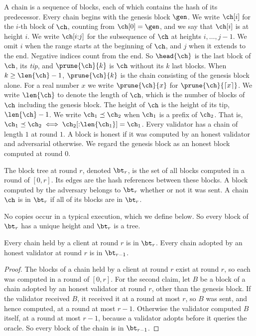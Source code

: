 A chain is a sequence of blocks, each of which contains the hash of its
predecessor. Every chain begins with the genesis block $\gen$. We write $\ch[i]$
for the $i$-th block of $\ch$, counting from $\ch[0]=\gen$, and we say that
$\ch[i]$ is at height $i$. We write $\ch[i{:}j]$ for the subsequence of $\ch$
at heights $i,\dots,j-1$. We omit $i$ when the range starts at the beginning
of $\ch$, and $j$ when it extends to the end. Negative indices count from the
end. So $\head{\ch}$ is the last block of $\ch$, its \emph{tip}, and
$\prune{\ch}{k}$ is $\ch$ without its $k$ last blocks. When $k\ge\len{\ch}-1$,
$\prune{\ch}{k}$ is the chain consisting of the genesis block alone. For a real
number $x$ we write $\prune{\ch}{x}$ for $\prune{\ch}{\lceil x\rceil}$. We write
$\len{\ch}$ to denote the length of $\ch$, which is the number of blocks of
$\ch$ including the genesis block. The height of $\ch$ is the height of its tip,
$\len{\ch}-1$. We write $\ch_1\preceq\ch_2$ when $\ch_1$ is a prefix of $\ch_2$.
That is, $\ch_1 \preceq \ch_2 \iff \ch_2[{:}\len{\ch_1}] = \ch_1$. Every
validator has a chain of length $1$ at round $1$. A block is honest if it was
computed by an honest validator and adversarial otherwise. We regard the genesis
block as an honest block computed at round $0$.

\begin{definition}\label{def.tree}
    The block tree at round $r$, denoted $\bt_r$, is the set of all blocks
    computed in a round of $[0,r]$. Its edges are the hash references between
    these blocks. A block computed by the adversary belongs to $\bt_r$ whether or
    not it was sent. A chain $\ch$ is in $\bt_r$ if all of its blocks are in
    $\bt_r$.
\end{definition}

No copies occur in a typical execution, which we define below. So every block
of $\bt_r$ has a unique height and $\bt_r$ is a tree.

\begin{lemma}[Membership]\label{lem.membership}
    Every chain held by a client at round $r$ is in $\bt_r$. Every chain
    adopted by an honest validator at round $r$ is in $\bt_{r-1}$.
\end{lemma}
\begin{proof}
    The blocks of a chain held by a client at round $r$ exist at round $r$, so
    each was computed in a round of $[0,r]$. For the second claim, let $B$ be a
    block of a chain adopted by an honest validator at round $r$, other than the
    genesis block. If the validator received $B$, it received it at a round at
    most $r$, so $B$ was sent, and hence computed, at a round at most $r-1$.
    Otherwise the validator computed $B$ itself, at a round at most $r-1$,
    because a validator adopts before it queries the oracle. So every block of
    the chain is in $\bt_{r-1}$.
\end{proof}

